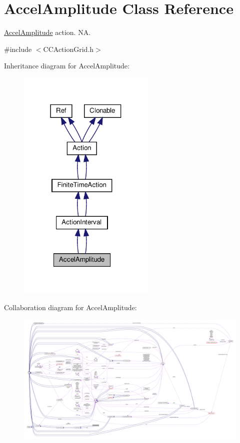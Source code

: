 \hypertarget{classAccelAmplitude}{}\section{Accel\+Amplitude Class Reference}
\label{classAccelAmplitude}


\hyperlink{classAccelAmplitude}{Accel\+Amplitude} action.  NA.  




{\ttfamily \#include $<$C\+C\+Action\+Grid.\+h$>$}



Inheritance diagram for Accel\+Amplitude\+:
\nopagebreak
\begin{figure}[H]
\begin{center}
\leavevmode
\includegraphics[width=186pt]{classAccelAmplitude__inherit__graph}
\end{center}
\end{figure}


Collaboration diagram for Accel\+Amplitude\+:
\nopagebreak
\begin{figure}[H]
\begin{center}
\leavevmode
\includegraphics[width=350pt]{classAccelAmplitude__coll__graph}
\end{center}
\end{figure}
